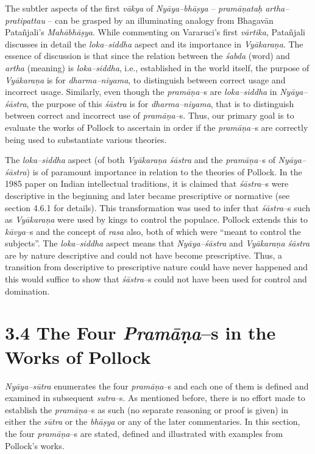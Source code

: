 The subtler aspects of the first \textit{vākya} of \textit{Nyāya–bhāṣya }– \textit{pramāṇataḥ artha–pratipattau} – can be grasped by an illuminating analogy from Bhagavān Patañjali’s \textit{Mahābhāṣya}. While commenting on Vararuci's first \textit{vārtika}, Patañjali discusses in detail the \textit{loka–siddha} aspect and its importance in \textit{Vyākaraṇa}. The essence of discussion is that since the relation between the \textit{śabda} (word) and \textit{artha} (meaning) is \textit{loka–siddha}, i.e., established in the world itself, the purpose of \textit{Vyākaraṇa} is for \textit{dharma–niyama}, to distinguish between correct usage and incorrect usage. Similarly, even though the \textit{pramāṇa–}s are \textit{loka–siddha} in \textit{Nyāya–śāstra}, the purpose of this \textit{śāstra} is for \textit{dharma–niyama}, that is to distinguish between correct and incorrect use of \textit{pramāṇa–}s. Thus, our primary goal is to evaluate the works of Pollock to ascertain in order if the \textit{pramāṇa–}s are correctly being used to substantiate various theories.

The \textit{loka–siddha }aspect (of both \textit{Vyākaraṇa śāstra} and the \textit{pramāṇa–}s of \textit{Nyāya–śāstra}) is of paramount importance in relation to the theories of Pollock. In the 1985 paper on Indian intellectual traditions, it is claimed that \textit{śāstra}–s were descriptive in the beginning and later became prescriptive or normative (see section 4.6.1 for details). This transformation was used to infer that \textit{śāstra}–s such as \textit{Vyākaraṇa} were used by kings to control the populace. Pollock extends this to \textit{kāvya}–s and the concept of \textit{rasa} also, both of which were “meant to control the subjects”. The \textit{loka–siddha }aspect means that \textit{Nyāya–śāstra} and \textit{Vyākaraṇa śāstra} are by nature descriptive and could not have become prescriptive. Thus, a transition from descriptive to prescriptive nature could have never happened and this would suffice to show that \textit{śāstra}–s could not have been used for control and domination.


\section*{3.4 The Four \textit{Pramāṇa}–s in the Works of Pollock}

\textit{Nyāya–sūtra }enumerates the four \textit{pramāṇa}–s and each one of them is defined and examined in subsequent \textit{sutra}–s. As mentioned before, there is no effort made to establish the \textit{pramāṇa}–s as such (no separate reasoning or proof is given) in either the \textit{sūtra} or the \textit{bhāṣya} or any of the later commentaries. In this section, the four \textit{pramāṇa}–s are stated, defined and illustrated with examples from Pollock’s works.

